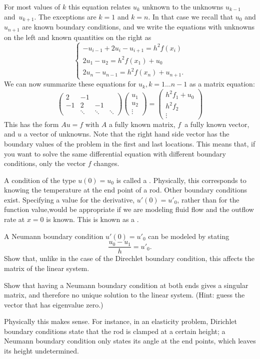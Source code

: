For most values of $k$ this equation relates $u_k$ unknown to the
unknowns $u_{k-1}$ and~$u_{k+1}$. The exceptions are $k=1$ and
$k=n$. In that case we recall that $u_0$ and $u_{n+1}$ are known
boundary conditions,
and we write the equations with unknowns on the left and known
quantities on the right as
\[
\begin{cases}
  -u_{i-1} + 2u_i - u_{i+1} = h^2f(x_i)\\
  2u_1-u_2=h^2f(x_1)+u_0\\
  2u_n-u_{n-1}=h^2f(x_{n})+u_{n+1}.
\end{cases}
\]
We can now summarize these equations for $u_k,k=1\ldots n-1$
as a matrix equation:
\begin{equation}
    \begin{pmatrix}
      2&-1\\ -1&2&-1\\ &\ddots&\ddots&\ddots
    \end{pmatrix}
    \begin{pmatrix}
      u_1\\ u_2\\ \vdots
    \end{pmatrix}
  =
    \begin{pmatrix}
      h^2f_1+u_0\\ h^2f_2\\ \vdots
    \end{pmatrix}
    \label{eq:1d2nd-matrix-vector}
\end{equation}
This has the form $Au=f$ with $A$ a fully known matrix, $f$~a fully
known vector, and $u$ a vector of unknowns. Note that the right hand
side vector has the boundary values of the problem in the first and
last locations. This means that, if you want to solve the same
differential equation with different boundary conditions, only the
vector $f$ changes.

\begin{exercise}
  A condition of the type $u(0)=u_0$ is called a . Physically, this corresponds to knowing the
  temperature at the end point of a rod. Other boundary conditions
  exist. Specifying a value for the derivative, $u'(0)=u'_0$, rather
  than for the function value,would be appropriate if we are modeling
  fluid flow and the outflow rate at $x=0$ is known. This is known as
  a .

  A Neumann boundary condition $u'(0)=u'_0$ can be modeled by stating
  \[ \frac{u_0-u_1}h=u'_0. \]
  Show that, unlike in the case of the Direchlet boundary condition,
  this affects the matrix of the linear system. 

  Show that having a
  Neumann boundary condition at both ends gives a singular
  matrix, and therefore no unique solution to the linear system.
  (Hint: guess the vector that has eigenvalue zero.)

  Physically this makes sense. For instance, in an elasticity problem,
  Dirichlet boundary conditions state that the rod is clamped at a
  certain height; a Neumann boundary condition only states its angle
  at the end points, which leaves its height undetermined.
\end{exercise}

